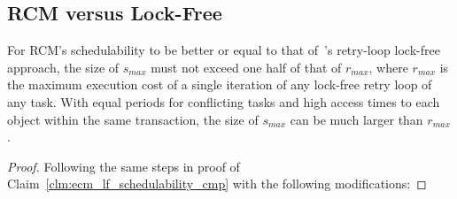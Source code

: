 \subsection{RCM versus Lock-Free}\label{subsec:rcm_vs_lf}
%
\begin{clm}\label{clm:rcm_vs_lf}
%
For RCM's schedulability to be better or equal to that of~\cite{key-5}'s retry-loop lock-free approach, the size of $s_{max}$ must not exceed one half of that of $r_{max}$, where $r_{max}$ is the maximum execution cost of a single iteration of any lock-free retry loop of any task. With equal periods for conflicting tasks and high access times to each object within the same transaction, the size of $s_{max}$ can be much larger than $r_{max}$.
%
\end{clm}
%
\begin{proof}\normalfont
%
Following the same steps in proof of Claim~\ref{clm:ecm_lf_schedulability_cmp} with the following modifications:


\end{proof}
